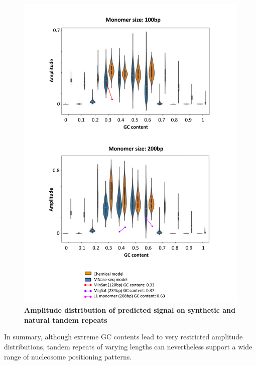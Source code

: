 \documentclass[11pt]{book}
\begin{document}
\begin{figure}
    \centering
    \includegraphics[width=1\textwidth]{Figures/Results/TR_monomer_GC-1.pdf}
    \caption{\textbf{Amplitude distribution of predicted signal on synthetic and natural tandem repeats}}
    \label{fig:synth_TR_GC_content}
\end{figure}

In summary, although extreme GC contents lead to very restricted amplitude distributions, tandem repeats of varying lengths can nevertheless support a wide range of nucleosome positioning patterns.
\end{document}
